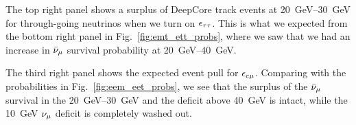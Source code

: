 The top right panel shows a surplus of DeepCore track events at \SIrange{20}{30}{\GeV} for through-going neutrinos when we turn on $\epsilon_{\tau\tau}$. This is what we expected from the bottom right panel in Fig.~\ref{fig:emt_ett_probs}, where we saw that we had an increase in $\bar{\nu}_\mu$ survival probability at \SIrange{20}{40}{\GeV}. 

The third right panel shows the expected event pull for $\epsilon_{e\mu}$. Comparing with the probabilities in Fig.~\ref{fig:eem_eet_probs}, we see that the surplus of the $\bar{\nu}_\mu$ survival in the \SIrange{20}{30}{\GeV} and the deficit above \SI{40}{\GeV} is intact, while the \SI{10}{\GeV} $\nu_\mu$ deficit is completely washed out.


% 